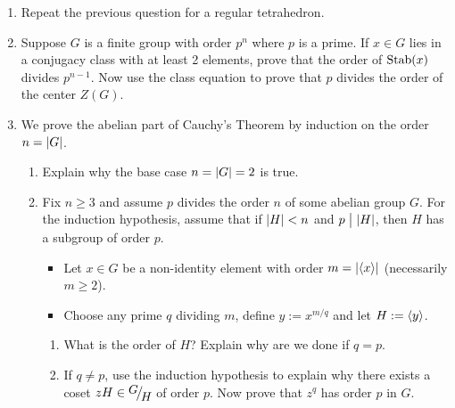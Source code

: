 \begin{exercises}{}{}
\begin{enumerate}
	
		\item Repeat the previous question for a regular tetrahedron.
		
		
		
		\item Suppose $G$ is a finite group with order $p^n$ where $p$ is a prime. If $x\in G$ lies in a conjugacy class with at least 2 elements, prove that the order of $\operatorname{Stab}(x)$ divides $p^{n-1}$. Now use the class equation to prove that $p$ divides the order of the center $Z(G)$.
	
		
		\item\label{exs:cauchysthmabelian} We prove the abelian part of Cauchy's Theorem by induction on the order $n=\left| G\right|$.
		\begin{enumerate}
		  \item Explain why the base case $n=\left| G\right|=2$ is true.
		  \item Fix $n\ge 3$ and assume $p$ divides the order $n$ of some abelian group $G$. For the induction hypothesis, assume that if $\left| H\right|<n$ and $p\bigm|\left| H\right|$, then $H$ has a subgroup of order $p$. %
		  \begin{itemize}
				\item Let $x\in G$ be a non-identity element with order $m=\left| \left\langle x\right\rangle\right|$ (necessarily $m\ge 2$).
				\item Choose any prime $q$ dividing $m$, define $y:=x^{m/q}$ and let $H:=\left\langle y\right\rangle$.
			\end{itemize}
			\begin{enumerate}
			  \item What is the order of $H$? Explain why are we done if $q=p$.
		  	\item If $q\neq p$, use the induction hypothesis to explain why there exists a coset $zH\in \quotient GH$ of order $p$. Now prove that $z^q$ has order $p$ in $G$.
		  \end{enumerate}
		\end{enumerate}
		
		
	\end{enumerate}
\end{exercises}

